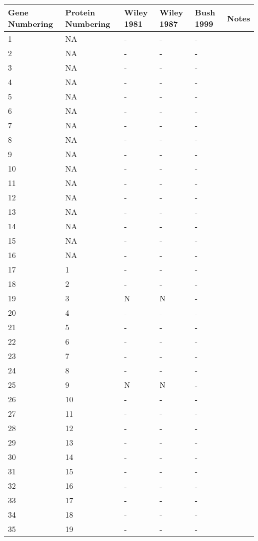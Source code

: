 \documentclass[10pt]{article}
\begin{document}
\begin{longtable}{llllll}
  \hline
Gene Numbering & Protein Numbering & Wiley 1981 & Wiley 1987 & Bush 1999 & Notes \\ 
  \hline
  1 & NA & - & - & - &  \\ 
    2 & NA & - & - & - &  \\ 
    3 & NA & - & - & - &  \\ 
    4 & NA & - & - & - &  \\ 
    5 & NA & - & - & - &  \\ 
    6 & NA & - & - & - &  \\ 
    7 & NA & - & - & - &  \\ 
    8 & NA & - & - & - &  \\ 
    9 & NA & - & - & - &  \\ 
   10 & NA & - & - & - &  \\ 
   11 & NA & - & - & - &  \\ 
   12 & NA & - & - & - &  \\ 
   13 & NA & - & - & - &  \\ 
   14 & NA & - & - & - &  \\ 
   15 & NA & - & - & - &  \\ 
   16 & NA & - & - & - &  \\ 
   17 & 1 & - & - & - &  \\ 
   18 & 2 & - & - & - &  \\ 
   19 & 3 & N & N & - &  \\ 
   20 & 4 & - & - & - &  \\ 
   21 & 5 & - & - & - &  \\ 
   22 & 6 & - & - & - &  \\ 
   23 & 7 & - & - & - &  \\ 
   24 & 8 & - & - & - &  \\ 
   25 & 9 & N & N & - &  \\ 
   26 & 10 & - & - & - &  \\ 
   27 & 11 & - & - & - &  \\ 
   28 & 12 & - & - & - &  \\ 
   29 & 13 & - & - & - &  \\ 
   30 & 14 & - & - & - &  \\ 
   31 & 15 & - & - & - &  \\ 
   32 & 16 & - & - & - &  \\ 
   33 & 17 & - & - & - &  \\ 
   34 & 18 & - & - & - &  \\ 
   35 & 19 & - & - & - &  \\ 

\end{longtable}
\end{document}
